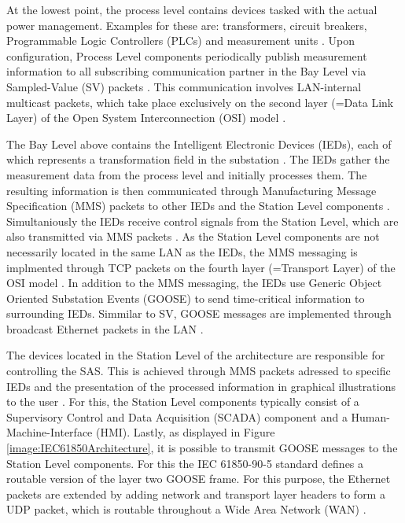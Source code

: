 \documentclass[conference, onecolumn, a4paper]{IEEEtran}
\begin{document}
\noindent At the lowest point, the process level contains devices tasked with the actual power management. Examples for these are: transformers, circuit 
breakers, Programmable Logic Controllers (PLCs) and measurement units \cite{SGRWin_IEC61850Architecture:2021}. Upon configuration, Process Level components 
periodically publish measurement information to all subscribing communication partner in the Bay Level via Sampled-Value (SV) packets 
\cite{TyphoonHIL_IEC61850SV:2021}. This communication involves LAN-internal multicast packets, which take place exclusively on the second layer 
(=Data Link Layer) of the Open System Interconnection (OSI) model \cite{TyphoonHIL_IEC61850SV:2021}. 

\smallskip
The Bay Level above contains the Intelligent Electronic Devices (IEDs), each of which represents a transformation field in the substation 
\cite[p. 39]{IEC61850-7-1:2011}. The IEDs gather the measurement data from the process level and initially processes them. The resulting information 
is then communicated through Manufacturing Message Specification (MMS) packets to other IEDs and the Station Level components \cite[p. 44]{IEC61850-8-1:2011}. 
Simultaniously the IEDs receive control signals from the Station Level, which are also transmitted via MMS packets \cite{trafficGen_IEC61850:2011}. 
As the Station Level components are not necessarily located in the same LAN as the IEDs, the MMS messaging is implmented through TCP packets on the 
fourth layer (=Transport Layer) of the OSI model \cite[p. 45]{IEC61850-8-1:2011}. In addition to the MMS messaging, the IEDs use Generic Object 
Oriented Substation Events (GOOSE) to send time-critical information to surrounding IEDs. Simmilar to SV, GOOSE messages are implemented through 
broadcast Ethernet packets in the LAN \cite{GOOSE_confidentiality_integrity:2020}.

\smallskip
The devices located in the Station Level of the architecture are responsible for controlling the SAS. This is achieved through MMS packets adressed 
to specific IEDs and the presentation of the processed information in graphical illustrations to the user \cite{SGRWin_IEC61850Architecture:2021}. 
For this, the Station Level components typically consist of a Supervisory Control and Data Acquisition (SCADA) component and a Human-Machine-Interface 
(HMI). Lastly, as displayed in Figure \ref{image:IEC61850Architecture}, it is possible to transmit GOOSE messages to the Station Level components. 
For this the IEC 61850-90-5 standard \cite{IEC61850-90-5:2012} defines a routable version of the layer two GOOSE frame. For this purpose, the Ethernet 
packets are extended by adding network and transport layer headers to form a UDP packet, which is routable throughout a Wide Area Network (WAN) 
\cite{routable_GOOSE_SV:2020}.
\end{document}
